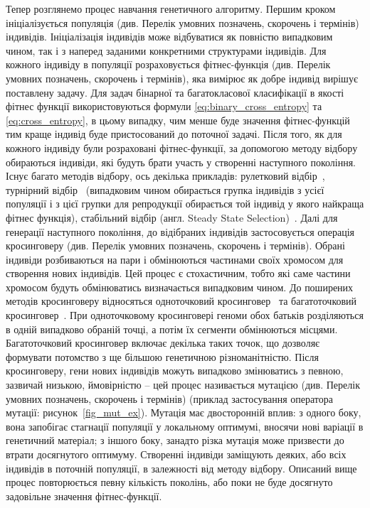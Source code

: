 Тепер розглянемо процес навчання генетичного алгоритму. Першим кроком ініціалізується популяція (див. Перелік умовних позначень, скорочень і термінів) індивідів. Ініціалізація індивідів може відбуватися як повністю випадковим чином, так і з наперед заданими конкретними структурами індивідів. Для кожного індивіду в популяції розраховується фітнес-функція (див. Перелік умовних позначень, скорочень і термінів), яка вимірює як добре індивід вирішує поставлену задачу. Для задач бінарної та багатокласової класифікації в якості фітнес функції використовуються формули \ref{eq:binary_cross_entropy} та \ref{eq:cross_entropy}, в цьому випадку, чим менше буде значення фітнес-функцій тим краще індивід буде пристосований до поточної задачі. Після того, як для кожного індивіду були розраховані фітнес-функції, за допомогою методу відбору обираються індивіди, які будуть брати участь у створенні наступного покоління. Існує багато методів відбору, ось декілька прикладів: рулетковий відбір~\cite{ct2}, турнірний відбір~\cite{ct3} (випадковим чином обирається групка індивідів з усієї популяції і з цієї групки для репродукції обирається той індивід у якого найкраща фітнес функція), стабільний відбір (англ. Steady State Selection)~\cite{ct5}. Далі для генерації наступного покоління, до відібраних індивідів застосовується операція кросинговеру (див. Перелік умовних позначень, скорочень і термінів). Обрані індивіди розбиваються на пари і обмінюються частинами своїх хромосом для створення нових індивідів. Цей процес є стохастичним, тобто які саме частини хромосом будуть обмінюватись визначається випадковим чином. До поширених методів кросинговеру відносяться одноточковий кросинговер~\cite{ct10} та багатоточковий кросинговер~\cite{ct11}. При одноточковому кросинговері геноми обох батьків розділяються в одній випадково обраній точці, а потім їх сегменти обмінюються місцями. Багатоточковий кросинговер включає декілька таких точок, що дозволяє формувати потомство з ще більшою генетичною різноманітністю. Після кросинговеру, гени нових індивідів можуть випадково змінюватись з певною, зазвичай низькою, ймовірністю -- цей процес називається мутацією (див. Перелік умовних позначень, скорочень і термінів) (приклад застосування оператора мутації: рисунок~\ref{fig_mut_ex}). Мутація має двосторонній вплив: з одного боку, вона запобігає стагнації популяції у локальному оптимумі, вносячи нові варіації в генетичний матеріал; з іншого боку, занадто різка мутація може призвести до втрати досягнутого оптимуму. Створенні індивіди заміщують деяких, або всіх індивідів в поточній популяції, в залежності від методу відбору. Описаний вище процес повторюється певну кількість поколінь, або поки не буде досягнуто задовільне значення фітнес-функції.

